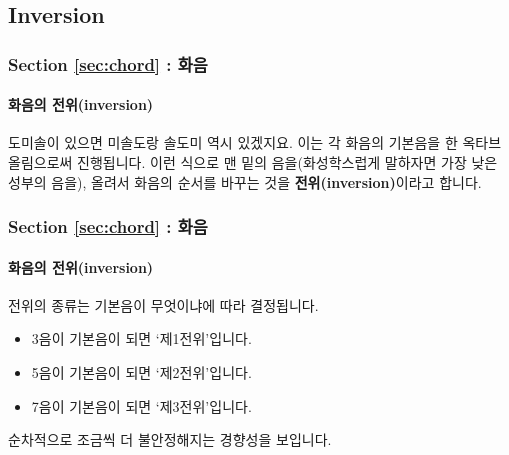 \documentclass{beamer}
\begin{document}
	\subsection{Inversion}
	\begin{frame}
		\frametitle{Section \ref{sec:chord} : 화음}
		\framesubtitle{화음의 전위(inversion)}
		도미솔이 있으면 미솔도랑 솔도미 역시 있겠지요. 이는 각 화음의 기본음을 한 옥타브 올림으로써 진행됩니다. 이런 식으로 맨 밑의 음을(화성학스럽게 말하자면 가장 낮은 성부의 음을), 올려서 화음의 순서를 바꾸는 것을 {\bf 전위(inversion)}이라고 합니다.
	\end{frame}
	
	\begin{frame}
		\frametitle{Section \ref{sec:chord} : 화음}
		\framesubtitle{화음의 전위(inversion)}
		전위의 종류는 기본음이 무엇이냐에 따라 결정됩니다.
		\begin{itemize}
			\item 3음이 기본음이 되면 `제1전위'입니다.
			\item 5음이 기본음이 되면 `제2전위'입니다.
			\item 7음이 기본음이 되면 `제3전위'입니다.
		\end{itemize}
		순차적으로 조금씩 더 불안정해지는 경향성을 보입니다.
	\end{frame}
	
\end{document}
